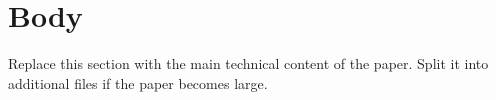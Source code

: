 \section{Body}

Replace this section with the main technical content of the paper. Split it
into additional files if the paper becomes large.